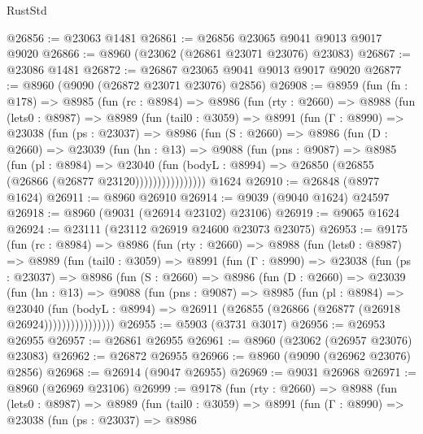 \begin{lexlean}{RustStd}
\begin{coremodule}
@26856 := @23063 @1481
@26861 := @26856 @23065 @9041 @9013 @9017 @9020
@26866 := @8960 (@23062 (@26861 @23071 @23076) @23083)
@26867 := @23086 @1481
@26872 := @26867 @23065 @9041 @9013 @9017 @9020
@26877 := @8960 (@9090 (@26872 @23071 @23076) @2856)
@26908 := @8959
    (fun (fn : @178) =>
    @8985
      (fun (rc : @8984) =>
      @8986
        (fun (rty : @2660) =>
        @8988
          (fun (lets0 : @8987) =>
          @8989
            (fun (tail0 : @3059) =>
            @8991
              (fun (Γ : @8990) =>
              @23038
                (fun (ps : @23037) =>
                @8986
                  (fun (S : @2660) =>
                  @8986
                    (fun (D : @2660) =>
                    @23039
                      (fun (hn : @13) =>
                      @9088
                        (fun (pns : @9087) =>
                        @8985
                          (fun (pl : @8984) =>
                          @23040
                            (fun (bodyL : @8994) =>
                            @26850 (@26855 (@26866 (@26877 @23120))))))))))))))))
    @1624
@26910 := @26848 (@8977 @1624)
@26911 := @8960 @26910
@26914 := @9039 (@9040 @1624) @24597
@26918 := @8960 (@9031 (@26914 @23102) @23106)
@26919 := @9065 @1624
@26924 := @23111 (@23112 @26919 @24600 @23073 @23075)
@26953 := @9175
    (fun (rc : @8984) =>
    @8986
      (fun (rty : @2660) =>
      @8988
        (fun (lets0 : @8987) =>
        @8989
          (fun (tail0 : @3059) =>
          @8991
            (fun (Γ : @8990) =>
            @23038
              (fun (ps : @23037) =>
              @8986
                (fun (S : @2660) =>
                @8986
                  (fun (D : @2660) =>
                  @23039
                    (fun (hn : @13) =>
                    @9088
                      (fun (pns : @9087) =>
                      @8985
                        (fun (pl : @8984) =>
                        @23040
                          (fun (bodyL : @8994) =>
                          @26911 (@26855 (@26866 (@26877 (@26918 @26924))))))))))))))))
@26955 := @5903 (@3731 @3017)
@26956 := @26953 @26955
@26957 := @26861 @26955
@26961 := @8960 (@23062 (@26957 @23076) @23083)
@26962 := @26872 @26955
@26966 := @8960 (@9090 (@26962 @23076) @2856)
@26968 := @26914 (@9047 @26955)
@26969 := @9031 @26968
@26971 := @8960 (@26969 @23106)
@26999 := @9178
    (fun (rty : @2660) =>
    @8988
      (fun (lets0 : @8987) =>
      @8989
        (fun (tail0 : @3059) =>
        @8991
          (fun (Γ : @8990) =>
          @23038
            (fun (ps : @23037) =>
            @8986

\end{coremodule}
\end{lexlean}
